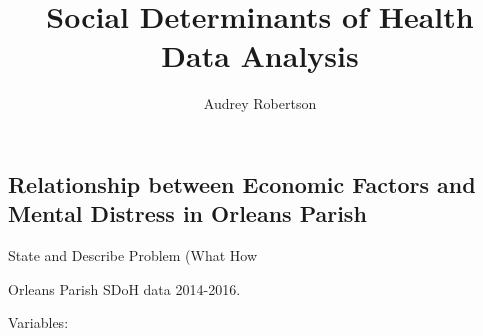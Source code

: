 \documentclass[
]{article}
\title{Social Determinants of Health Data Analysis}
\author{Audrey Robertson}
\date{}
\begin{document}
\maketitle

\hypertarget{relationship-between-economic-factors-and-mental-distress-in-orleans-parish}{%
\subsection{Relationship between Economic Factors and Mental Distress in
Orleans
Parish}\label{relationship-between-economic-factors-and-mental-distress-in-orleans-parish}}

State and Describe Problem (What How

Orleans Parish SDoH data 2014-2016.

Variables:
\end{document}
